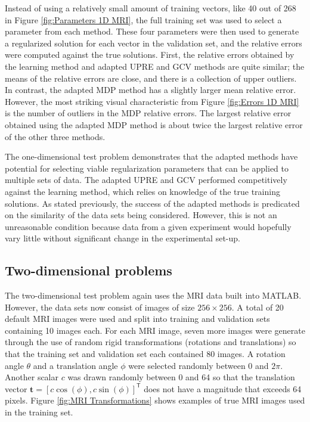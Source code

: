 \documentclass[12pt]{article}
\newcommand{\tVec}{\mathbf{t}}	%
\newcommand{\trans}[1]{{#1}^\mathsf{T}}	%
\begin{document}
\noindent Instead of using a relatively small amount of training vectors, like 40 out of 268 in Figure \ref{fig:Parameters 1D MRI}, the full training set was used to select a parameter from each method. These four parameters were then used to generate a regularized solution for each vector in the validation set, and the relative errors were computed against the true solutions. First, the relative errors obtained by the learning method and adapted UPRE and GCV methods are quite similar; the means of the relative errors are close, and there is a collection of upper outliers. In contrast, the adapted MDP method has a slightly larger mean relative error. However, the most striking visual characteristic from Figure \ref{fig:Errors 1D MRI} is the number of outliers in the MDP relative errors. The largest relative error obtained using the adapted MDP method is about twice the largest relative error of the other three methods. \par 
The one-dimensional test problem demonstrates that the adapted methods have potential for selecting viable regularization parameters that can be applied to multiple sets of data. The adapted UPRE and GCV performed competitively against the learning method, which relies on knowledge of the true training solutions. As stated previously, the success of the adapted methods is predicated on the similarity of the data sets being considered. However, this is not an unreasonable condition because data from a given experiment would hopefully vary little without significant change in the experimental set-up.

\subsection{Two-dimensional problems} \label{sec:2D}
The two-dimensional test problem again uses the MRI data built into MATLAB. However, the data sets now consist of images of size $256 \times 256$. A total of 20 default MRI images were used and split into training and validation sets containing 10 images each. For each MRI image, seven more images were generate through the use of random rigid transformations (rotations and translations) so that the training set and validation set each contained 80 images. A rotation angle $\theta$ and a translation angle $\phi$ were selected randomly between 0 and $2\pi$. Another scalar $c$ was drawn randomly between 0 and 64 so that the translation vector $\tVec = \trans{[c\cos(\phi),c\sin(\phi)]}$ does not have a magnitude that exceeds 64 pixels. Figure \ref{fig:MRI Transformations} shows examples of true MRI images used in the training set. 
\end{document}
